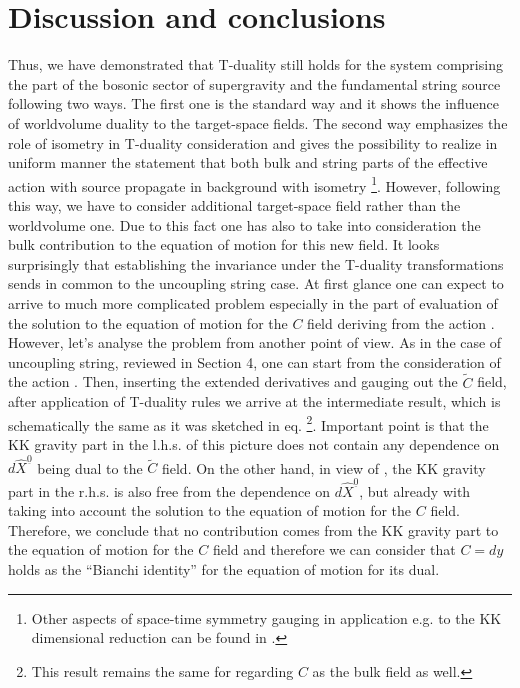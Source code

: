 \documentclass[a4paper,11pt]{article}
\begin{document}
\section{Discussion and conclusions}

Thus, we have demonstrated that T-duality still holds for the system comprising
the part of the bosonic sector of supergravity and the fundamental string 
source following two ways. The first one is the standard way and it shows the
influence of worldvolume duality to the target-space fields. The second way
emphasizes the role of isometry in T-duality consideration and gives the
possibility to realize in uniform manner the statement that both bulk and 
string parts of the
effective action with source propagate in background with isometry 
\footnote{Other aspects of space-time symmetry gauging in application e.g. to
the KK dimensional reduction can be found in \cite{nur}.}. However, following 
this way, we have to consider additional
target-space field rather than the worldvolume one. Due to this fact one has
also to take into consideration the bulk contribution to the equation of motion
for this new field. 
It looks surprisingly that establishing the invariance under the 
T-duality transformations sends in common to the uncoupling string case. 
At first glance one can expect to arrive to much more complicated problem
especially in the part of evaluation of the solution to the equation
of motion for the $C$ field deriving from the action . However, let's
analyse the problem from another point of view. As in the case of uncoupling
string, reviewed in Section 4, one can start from the consideration of the
action . Then, inserting the extended derivatives and gauging out
the $\tilde{C}$ field, after application of T-duality rules we arrive at
the intermediate result, which is schematically the same as it was 
sketched in eq. 
\footnote{This result remains the same for regarding $C$ as the bulk field
as well.}. Important point is that the KK gravity part in
the l.h.s. of this picture does not contain any dependence on 
$d\hat{X}^{\underline 0}$ being dual to the $\tilde{C}$ field. On the other
hand, in view of , the KK gravity part in the r.h.s. is also free from 
the dependence on $d\hat{X}^{\underline 0}$, but already with taking into 
account the solution to the equation of motion for the $C$ field. Therefore, we
conclude that no contribution comes from the KK gravity part to the equation of
motion for the $C$ field and therefore we can consider that $C=dy$ holds as
the ``Bianchi identity'' for the equation of motion for its dual.
\end{document}
